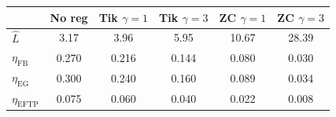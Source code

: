 \begin{tabular}{lccccc}
\toprule
 & No reg & Tik $\gamma=1$ & Tik $\gamma=3$ & ZC $\gamma=1$ & ZC $\gamma=3$\\
\midrule
$\hat L$ & 3.17 & 3.96 & 5.95 & 10.67 & 28.39\\
$\eta_{\mathrm{FB}}$ & 0.270 & 0.216 & 0.144 & 0.080 & 0.030\\
$\eta_{\mathrm{EG}}$ & 0.300 & 0.240 & 0.160 & 0.089 & 0.034\\
$\eta_{\mathrm{EFTP}}$ & 0.075 & 0.060 & 0.040 & 0.022 & 0.008\\
\bottomrule
\end{tabular}

